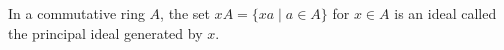 In a commutative ring $A$, the set $xA = \{xa \mid a \in A\}$ for $x \in A$ is an ideal called the principal ideal generated by $x$.
